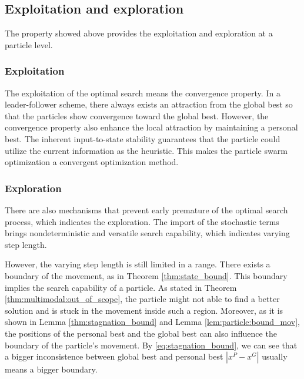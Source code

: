 \subsection{Exploitation and exploration}

The property showed above provides the exploitation and exploration at a particle level.

\subsubsection{Exploitation}

The exploitation of the optimal search means the convergence property.
In a leader-follower scheme, there always exists an attraction from the global best so that the particles show convergence toward the global best.
However, the convergence property also enhance the local attraction by maintaining a personal best.
The inherent input-to-state stability guarantees that the particle could utilize the current information as the heuristic.
This makes the particle swarm optimization a convergent optimization method.

\subsubsection{Exploration}

There are also mechanisms that prevent early premature of the optimal search process, which indicates the exploration.
The import of the stochastic terms brings nondeterministic and versatile search capability, which indicates varying step length.

However, the varying step length is still limited in a range. 
There exists a boundary of the movement, as in Theorem \ref{thm:state_bound}.
This boundary implies the search capability of a particle.
As stated in Theorem \ref{thm:multimodal:out_of_scope}, the particle might not able to find a better solution and is stuck in the movement inside such a region.
Moreover, as it is shown in Lemma \ref{thm:stagnation_bound} and Lemma \ref{lem:particle:bound_mov}, the positions of the personal best and the global best can also influence the boundary of the particle's movement.
By \eqref{eq:stagnation_bound}, we can see that a bigger inconsistence between global best and personal best $ | x^{P} - x^{G} | $ usually means a bigger boundary.



